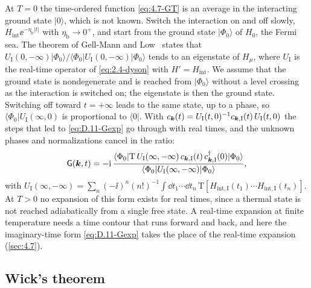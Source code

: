 At $T = 0$ the time-ordered function \cref{eq:4.7-GT} is an average in the interacting ground state $|0\rangle$, which is not known. Switch the interaction on and off slowly, $H_{\mathrm{int}}\ee^{-\eta_{\mathrm{b}}|t|}$ with $\eta_{\mathrm{b}} \to 0^+$, and start from the ground state $|\Phi_0\rangle$ of $H_0$, the Fermi sea. The theorem of Gell-Mann and Low~\cite{gellmann1951bound} states that $U_{\mathrm{I}}(0,-\infty)|\Phi_0\rangle/\langle\Phi_0|U_{\mathrm{I}}(0,-\infty)|\Phi_0\rangle$ tends to an eigenstate of $H_\mu$, where $U_{\mathrm{I}}$ is the real-time operator of \cref{eq:2.4-dyson} with $H' = H_{\mathrm{int}}$. We assume that the ground state is nondegenerate and is reached from $|\Phi_0\rangle$ without a level crossing as the interaction is switched on; the eigenstate is then the ground state. Switching off toward $t = +\infty$ leads to the same state, up to a phase, so $\langle\Phi_0|U_{\mathrm{I}}(\infty,0)$ is proportional to $\langle0|$. With $c_{\bm{k}}(t) = U_{\mathrm{I}}(t,0)^{-1}c_{\bm{k},\mathrm{I}}(t)\,U_{\mathrm{I}}(t,0)$ the steps that led to \cref{eq:D.11-Gexp} go through with real times, and the unknown phases and normalizations cancel in the ratio:
\begin{equation}
  \mathsf{G}(\bm{k},t) = -\mathrm{i}\,\frac{\langle\Phi_0|\mathrm{T}\,U_{\mathrm{I}}(\infty,-\infty)\,c_{\bm{k},\mathrm{I}}(t)\,c^\dagger_{\bm{k},\mathrm{I}}(0)|\Phi_0\rangle}{\langle\Phi_0|U_{\mathrm{I}}(\infty,-\infty)|\Phi_0\rangle} ,
  \label{eq:D.11-GT}
\end{equation}
with $U_{\mathrm{I}}(\infty,-\infty) = \sum_n(-\ii)^n(n!)^{-1}\int\dd t_1\cdots\dd t_n\,\mathrm{T}[H_{\mathrm{int},\mathrm{I}}(t_1)\cdots H_{\mathrm{int},\mathrm{I}}(t_n)]$. At $T > 0$ no expansion of this form exists for real times, since a thermal state is not reached adiabatically from a single free state. A real-time expansion at finite temperature needs a time contour that runs forward and back, and here the imaginary-time form \cref{eq:D.11-Gexp} takes the place of the real-time expansion (\cref{sec:4.7}).

\subsection*{Wick's theorem}

